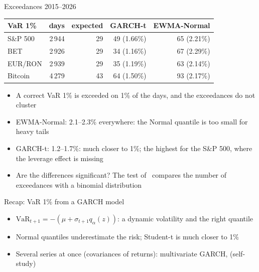 \begin{frame}{Exceedances 2015--2026}
\itemsize{\footnotesize}
\begin{center}
\footnotesize
\begin{tabular}{lrrrr}
\toprule
VaR 1\% & days & expected & GARCH-t & EWMA-Normal \\
\midrule
S\&P 500 & 2\,944 & 29 & 49 (1.66\%) & 65 (2.21\%) \\
BET & 2\,926 & 29 & 34 (1.16\%) & 67 (2.29\%) \\
EUR/RON & 2\,939 & 29 & 35 (1.19\%) & 63 (2.14\%) \\
Bitcoin & 4\,279 & 43 & 64 (1.50\%) & 93 (2.17\%) \\
\bottomrule
\end{tabular}
\end{center}
\begin{itemize}
    \item A correct VaR 1\% is exceeded on 1\% of the days, and the exceedances do not cluster
    \item EWMA-Normal: 2.1--2.3\% everywhere: the Normal quantile is too small for heavy tails
    \item GARCH-t: 1.2--1.7\%: much closer to 1\%; the highest for the S\&P 500, where the leverage effect is missing
    \item Are the differences significant? The test of \ compares the number of exceedances with a binomial distribution
\end{itemize}
\end{frame}

\begin{frame}{Recap: VaR 1\% from a GARCH model}
\itemsize{\small}
\begin{itemize}
    \item $\mathrm{VaR}_{t+1} = -(\mu + \sigma_{t+1}q_\alpha(z))$: a dynamic volatility and the right quantile
    \item Normal quantiles underestimate the risk; Student-t is much closer to 1\%
    \item Several series at once (covariances of returns): multivariate GARCH,  (self-study)
\end{itemize}
\end{frame}


